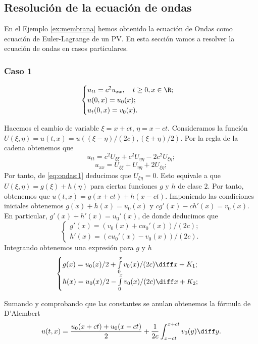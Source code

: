 \documentclass{article}
\begin{document}
\subsection{Resolución de la ecuación de ondas}

En el Ejemplo \ref{ex:membrana} hemos obtenido la ecuación de Ondas como ecuación de Euler-Lagrange de un PV. En esta sección vamos a resolver la ecuación de ondas en casos particulares.

\subsubsection{Caso 1}

\begin{equation}
\label{eq:ondas:1}
  \begin{cases}
    u_{tt} = c^2 u_{xx}, \quad t \ge 0, x \in \R; \\
    u(0,x) = u_0(x); \\
    u_t(0,x) = v_0(x).
  \end{cases}
\end{equation}

Hacemos el cambio de variable $\xi = x + ct$, $\eta = x -ct$. Consideramos la función $U(\xi, \eta) = u(t,x) = u( (\xi-\eta)/(2c), (\xi+\eta)/2)$. Por la regla de la cadena obtenemos que
\[ u_{tt} = c^{2} U_{\xi \xi} + c^2 U_{\eta \eta} - 2c^2 U_{\xi \eta}; \]
\[ u_{xx} = U_{\xi \xi} +  U_{\eta \eta} +2 U_{\xi \eta}; \]
Por tanto, de \eqref{eq:ondas:1} deducimos que $U_{\xi \eta} = 0$. Esto equivale a que $U(\xi, \eta) = g(\xi) + h(\eta)$ para ciertas funciones $g$ y $h$ de clase $2$. Por tanto, obtenemos que $u(t,x) = g(x+ct) + h(x-ct)$. Imponiendo las condiciones iniciales obtenemos $g(x)+h(x) = u_0(x)$ y $cg'(x)-ch'(x) = v_0(x)$. En particular, $g'(x) + h'(x) = u_0'(x)$, de donde deducimos que
\[
  \begin{cases}
    g'(x) = (v_0(x) + c u_0'(x)) / (2c); \\
    h'(x) = (c u_0'(x) - v_0(x)) / (2c).    
  \end{cases}
\]
Integrando obtenemos una expresión para $g$ y $h$
\[
  \begin{cases}
    g(x) = u_0(x) / 2 + \int\limits_{0}^{x} v_0(x) / (2c) \diff x + K_1; \\
    h(x) = u_0(x) / 2 - \int\limits_{0}^{x} v_0(x) / (2c) \diff x + K_2;
  \end{cases}
\]

Sumando y comprobando que las constantes se anulan obtenemos la fórmula de D'Alembert
\begin{equation}
\label{eq:onda:dalembert}
u(t,x) = \frac{u_0(x+ct) + u_0(x-ct)}{2} + \frac{1}{2c} \int_{x-ct}^{x+ct} v_0(y) \diff y.
\end{equation}
\end{document}
